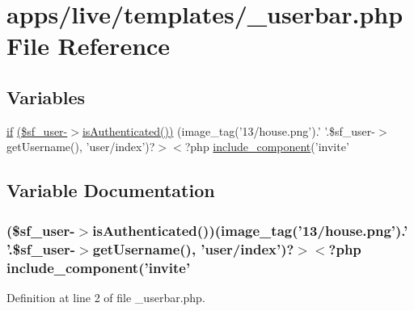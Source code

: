 \hypertarget{__userbar_8php}{\section{apps/live/templates/\-\_\-userbar.php File Reference}
\label{__userbar_8php}
}
\subsection*{Variables}
\begin{DoxyCompactItemize}
\item 
\hyperlink{live_2modules_2tournament_2templates_2__form_team_8php_ae30a307b320d8da5d9a945eaf68f7549}{if} \hyperlink{__userbar_8php_a3aabe4bd3f398bdb25d5c26c6d2723db}{(\$sf\-\_\-user-\/$>$is\-Authenticated())} (image\-\_\-tag('13/house.\-png').' '.\$sf\-\_\-user-\/$>$get\-Username(), 'user/index')?$>$$<$?php \hyperlink{frontend_2templates_2__navigation_8php_a0f87936cfbec594a177cabbcec470b8d}{include\-\_\-component}('invite'
\end{DoxyCompactItemize}


\subsection{Variable Documentation}
\hypertarget{__userbar_8php_a3aabe4bd3f398bdb25d5c26c6d2723db}{
\subsubsection[{(\$sf\-\_\-user-\/$>$is\-Authenticated())}]{ (\$sf\-\_\-user-\/$>$is\-Authenticated())(image\-\_\-tag('13/house.\-png').' '.\$sf\-\_\-user-\/$>$get\-Username(), 'user/index')?$>$$<$?php {\bf include\-\_\-component}('invite'}}\label{__userbar_8php_a3aabe4bd3f398bdb25d5c26c6d2723db}


Definition at line 2 of file \-\_\-userbar.\-php.

